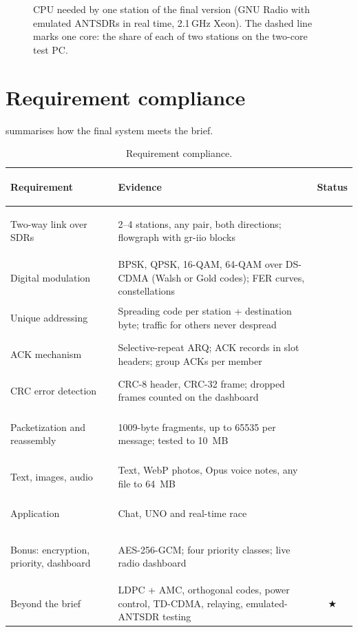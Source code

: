 \documentclass[11pt,a4paper,oneside]{report}
\newcommand{\yes}{\textcolor{wlteal}{\ding{51}}}
\begin{document}
\begin{figure}[htbp]
\centering
{}
\caption{CPU needed by one station of the final version (GNU Radio with emulated ANTSDRs in real time,
2.1\,GHz Xeon). The dashed line marks one core: the share of each of two stations on the two-core test PC.}\label{fig:cpu}
\end{figure}

\section{Requirement compliance}
 summarises how the final system meets the brief.

\begin{table}[htbp]
\centering\small
\caption{Requirement compliance.}\label{tab:compliance}
\begin{tabularx}{\linewidth}{@{}>{\bfseries\raggedright\arraybackslash}p{42mm}Lc@{}}
\toprule
Requirement & Evidence & Status\\
\midrule
Two-way link over SDRs & 2--4 stations, any pair, both directions; flowgraph with gr-iio blocks & \yes\\
Digital modulation & BPSK, QPSK, 16-QAM, 64-QAM over DS-CDMA (Walsh or Gold codes); FER curves, constellations & \yes\\
Unique addressing & Spreading code per station + destination byte; traffic for others never despread & \yes\\
ACK mechanism & Selective-repeat ARQ; ACK records in slot headers; group ACKs per member & \yes\\
CRC error detection & CRC-8 header, CRC-32 frame; dropped frames counted on the dashboard & \yes\\
Packetization and reassembly & \num{1009}-byte fragments, up to \num{65535} per message; tested to \SI{10}{MB} & \yes\\
Text, images, audio & Text, WebP photos, Opus voice notes, any file to \SI{64}{MB} & \yes\\
Application & Chat, UNO and real-time race & \yes\\
Bonus: encryption, priority, dashboard & AES-256-GCM; four priority classes; live radio dashboard & \yes\\
Beyond the brief & LDPC + AMC, orthogonal codes, power control, TD-CDMA, relaying, emulated-ANTSDR testing & $\bigstar$\\
\bottomrule
\end{tabularx}
\end{table}
\end{document}
